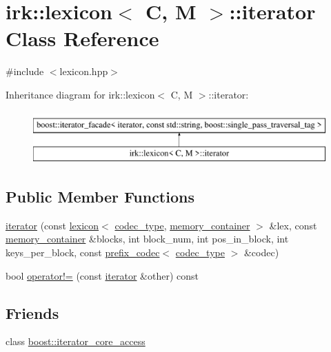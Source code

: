 \hypertarget{classirk_1_1lexicon_1_1iterator}{}\section{irk\+:\+:lexicon$<$ C, M $>$\+:\+:iterator Class Reference}
\label{classirk_1_1lexicon_1_1iterator}


{\ttfamily \#include $<$lexicon.\+hpp$>$}

Inheritance diagram for irk\+:\+:lexicon$<$ C, M $>$\+:\+:iterator\+:\begin{figure}[H]
\begin{center}
\leavevmode
\includegraphics[height=2.000000cm]{classirk_1_1lexicon_1_1iterator}
\end{center}
\end{figure}
\subsection*{Public Member Functions}
\begin{DoxyCompactItemize}
\item 
\mbox{\hyperlink{classirk_1_1lexicon_1_1iterator_a004a6a84da2be6ffb1bece079dee3ee8}{iterator}} (const \mbox{\hyperlink{classirk_1_1lexicon}{lexicon}}$<$ \mbox{\hyperlink{classirk_1_1lexicon_a3ec38dbe131c7b0a9551d05ad619fc89}{codec\+\_\+type}}, \mbox{\hyperlink{classirk_1_1lexicon_a2097b1f4bfc324504a9fe10af681b0be}{memory\+\_\+container}} $>$ \&lex, const \mbox{\hyperlink{classirk_1_1lexicon_a2097b1f4bfc324504a9fe10af681b0be}{memory\+\_\+container}} \&blocks, int block\+\_\+num, int pos\+\_\+in\+\_\+block, int keys\+\_\+per\+\_\+block, const \mbox{\hyperlink{classirk_1_1prefix__codec}{prefix\+\_\+codec}}$<$ \mbox{\hyperlink{classirk_1_1lexicon_a3ec38dbe131c7b0a9551d05ad619fc89}{codec\+\_\+type}} $>$ \&codec)
\item 
bool \mbox{\hyperlink{classirk_1_1lexicon_1_1iterator_a4495eb3025afbf531deafa7afd451d8e}{operator!=}} (const \mbox{\hyperlink{classirk_1_1lexicon_1_1iterator}{iterator}} \&other) const
\end{DoxyCompactItemize}
\subsection*{Friends}
\begin{DoxyCompactItemize}
\item 
class \mbox{\hyperlink{classirk_1_1lexicon_1_1iterator_ac09f73e325921cc50ebcd96bed0f8096}{boost\+::iterator\+\_\+core\+\_\+access}}
\end{DoxyCompactItemize}


